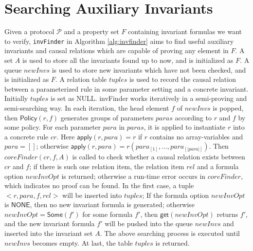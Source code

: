 \documentclass[final]{IEEEtran}
\begin{document}
\section{  Searching Auxiliary Invariants}\label{sec:invFinder}
Given a protocol $\mathcal{P}$ and a property set $F$ containing invariant formulas we want to verify, {\tt invFinder} in Algorithm \ref{alg:invfinder} aims to find useful auxiliary invariants and causal relations which are capable of proving any element in $F$.  A set $A$ is used to store all the invariants found up to now, and is initialized as  $F$. A queue  $newInvs$ is used to store new invariants which have not been checked,  and  is initialized as  $F$.  A relation table $tuples$ is used to record the causal relation between a parameterized rule in some parameter setting and a concrete invariant. Initially $tuples$ is set as NULL.
{\sf invFinder}  works iteratively in a semi-proving and semi-searching way. In each iteration, the head element $f$ of $newInvs$ is popped,  then $\mathsf{Policy}(r,f)$  generates groups of parameters $paras$  according to $r$ and $f$ by some policy. For each parameter $para$ in $paras$,   it is applied to instantiate $r$ into a concrete rule $cr$.  Here  $\mathsf{apply}(r,para)=r$ if $r$ contains no array-variables and $para=[]$; otherwise $\mathsf{apply}(r,para)=r(para_{[1]},..., para_{[|para|]})$. Then $coreFinder(cr,  f, A)$ is called to check
 whether  a causal relation exists between $cr$ and $f$; if there is such one relation item, the relation item $rel$ and a  formula option $newInvOpt$ is returned; otherwise a run-time error occurs in  $coreFinder$, which indicates no proof can be found. In the first case, a tuple $<r, para, f, rel>$ will be inserted into $tuples$; If the formula option $newInvOpt$ is $\mathsf{NONE}$, then no new invariant formula is generated; otherwise $newInvOpt=\mathsf{Some}(f')$ for some formula $f'$, then  $\mathsf{get}(newInvOpt)$ returns $f'$, and the new invariant formula $f'$ will be pushed into the queue $newInvs$ and inserted into the invariant set $A$.  The above searching process is executed until $newInvs$ becomes empty.  At last, the table $tuples$ is returned.

\SetAlFnt{\small}

\end{document}
